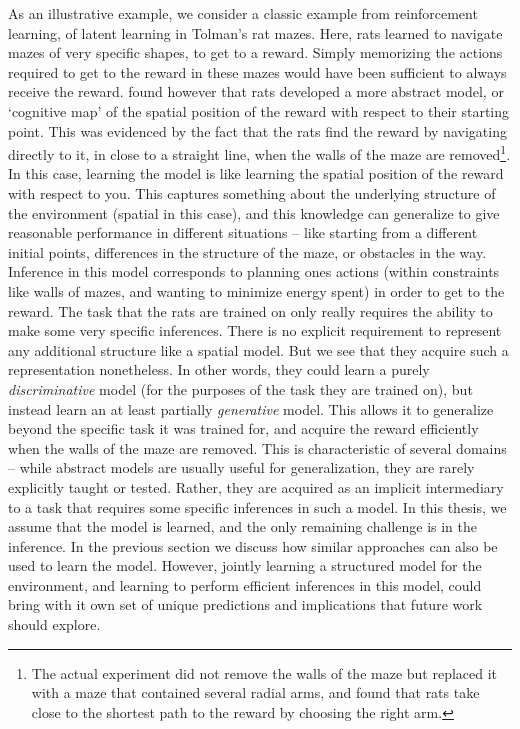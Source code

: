 As an illustrative example, we consider a classic example from reinforcement learning, of latent learning in Tolman's rat mazes\citep{tolman1948cognitive}. Here, rats learned to navigate mazes of very specific shapes, to get to a reward. Simply memorizing the actions required to get to the reward in these mazes would have been sufficient to always receive the reward. \citet{tolman1948cognitive} found however that rats developed a more abstract model, or `cognitive map' of the spatial position of the reward with respect to their starting point. This was evidenced by the fact that the rats find the reward by navigating directly to it, in close to a straight line, when the walls of the maze are removed\footnote{The actual experiment did not remove the walls of the maze but replaced it with a maze that contained several radial arms, and found that rats take close to the shortest path to the reward by choosing the right arm.}. In this case, learning the model is like learning the spatial position of the reward with respect to you. This captures something about the underlying structure of the environment (spatial in this case), and this knowledge can generalize to give reasonable performance in different situations -- like starting from a different initial points, differences in the structure of the maze, or obstacles in the way. Inference in this model corresponds to planning ones actions (within constraints like walls of mazes, and wanting to minimize energy spent) in order to get to the reward. The task that the rats are trained on only really requires the ability to make some very specific inferences. There is no explicit requirement to represent any additional structure like a spatial model. But we see that they acquire such a representation nonetheless. In other words, they could learn a purely \textit{discriminative} model (for the purposes of the task they are trained on), but instead learn an at least partially \textit{generative} model. This allows it to generalize beyond the specific task it was trained for, and acquire the reward efficiently when the walls of the maze are removed. This is characteristic of several domains -- while abstract models are usually useful for generalization, they are rarely explicitly taught or tested. Rather, they are acquired as an implicit intermediary to a task that requires  some specific inferences in such a model. In this thesis, we assume that the model is learned, and the only remaining challenge is in the inference. In the previous section we discuss how similar approaches can also be used to learn the model. However, jointly learning a structured model for the environment, and learning to perform efficient inferences in this model, could bring with it own set of unique predictions and implications that future work should explore.

